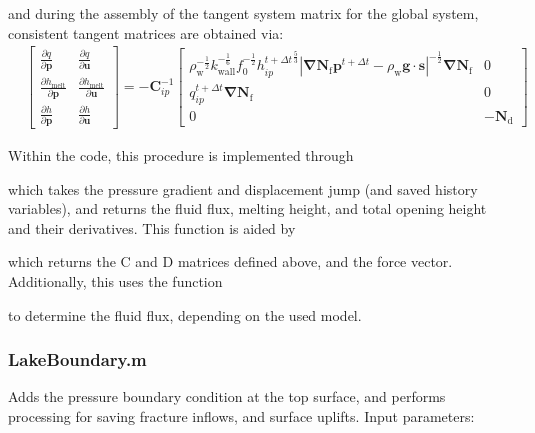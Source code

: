 \documentclass[3p]{elsarticle} %
\begin{document}
and during the assembly of the tangent system matrix for the global system, consistent tangent matrices are obtained via:
\begin{equation}
\begin{split}
    &\begin{bmatrix} \frac{\partial q}{\partial \mathbf{p}} & \frac{\partial q}{\partial \mathbf{u}} \\ \frac{\partial h_{\text{melt}}}{\partial \mathbf{p}} & \frac{\partial h_{\text{melt}}}{\partial \mathbf{u}} \\ \frac{\partial h}{\partial \mathbf{p}} & \frac{\partial h}{\partial \mathbf{u}} \end{bmatrix} = -\bm{C}^{-1}_{ip} \begin{bmatrix} \rho_{\text{w}}^{-\frac{1}{2}}k_{\text{wall}}^{-\frac{1}{6}}f_0^{-\frac{1}{2}} {h_{ip}^{t+\Delta t}}^{\frac{5}{3}}\left|\bm{\nabla}\mathbf{N}_\mathrm{f} \mathbf{p}^{t+\Delta t}-\rho_{\text{w}} \mathbf{g} \cdot \mathbf{s}\right|^{-\frac{1}{2}} \bm{\nabla} \mathbf{N}_\mathrm{f} & 0 \\ {q}_{ip}^{t+\Delta t} \bm{\nabla} \mathbf{N}_\mathrm{f} & 0 \\ 0 & -\bm{N}_\mathrm{d} \end{bmatrix} \label{SIeq:consistent_Tangent}
\end{split}
\end{equation}

Within the code, this procedure is implemented through

which takes the pressure gradient and displacement jump (and saved history variables), and returns the fluid flux, melting height, and total opening height and their derivatives. This function is aided by 

which returns the C and D matrices defined above, and the force vector. Additionally, this uses the function 

to determine the fluid flux, depending on the used model.

\subsubsection{LakeBoundary.m}
Adds the pressure boundary condition at the top surface, and performs processing for saving fracture inflows, and surface uplifts. Input parameters:

\end{document}
